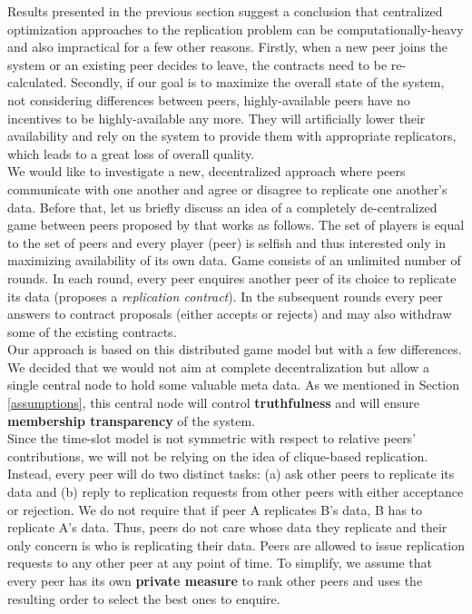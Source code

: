 \documentclass{pracamgren}
\begin{document}
Results presented in the previous section suggest a conclusion that centralized optimization approaches to the replication problem can be computationally-heavy and also impractical for a few other reasons. Firstly, when a new peer joins the system or an existing peer decides to leave, the contracts need to be re-calculated. Secondly, if our goal is to maximize the overall state of the system, not considering differences between peers, highly-available peers have no incentives to be highly-available any more. They will artificially lower their availability and rely on the system to provide them with appropriate replicators, which leads to a great loss of overall quality.\\

We would like to investigate a new, decentralized approach where peers communicate with one another and agree or disagree to replicate one another's data. Before that, let us briefly discuss an idea of a completely de-centralized game between peers proposed by \cite{krz} that works as follows. The set of players is equal to the set of peers and every player (peer) is selfish and thus interested only in maximizing availability of its own data. Game consists of an unlimited number of rounds. In each round, every peer enquires another peer of its choice to replicate its data (proposes a {\it replication contract}). In the subsequent rounds every peer answers to contract proposals (either accepts or rejects) and may also withdraw some of the existing contracts.\\

Our approach is based on this distributed game model but with a few differences. We decided that we would not aim at complete decentralization but allow a single central node to hold some valuable meta data. As we mentioned in Section \ref{assumptions}, this central node will control {\bf truthfulness} and will ensure {\bf membership transparency} of the system.\\

Since the time-slot model is not symmetric with respect to relative peers' contributions, we will not be relying on the idea of clique-based replication. Instead, every peer will do two distinct tasks: (a) ask other peers to replicate its data and (b) reply to replication requests from other peers with either acceptance or rejection. We do not require that if peer A replicates B's data, B has to replicate A's data. Thus, peers do not care whose data they replicate and their only concern is who is replicating their data. Peers are allowed to issue replication requests to any other peer at any point of time. To simplify, we assume that every peer has its own {\bf private measure} to rank other peers and uses the resulting order to select the best ones to enquire.\\
\end{document}
